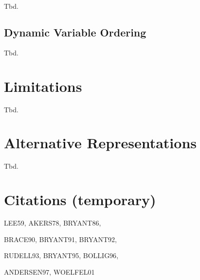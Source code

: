 \documentclass{vldb}
\begin{document}
Tbd.

\subsection{Dynamic Variable Ordering}
\label{subsec:dynamic-variable-ordering}

Tbd.

\section{Limitations}
\label{sec:limitations}

Tbd.

\section{Alternative Representations}
\label{sec:alternative-representations}

Tbd.

\section{Citations (temporary)}

\noindent
\par
LEE59\cite{LEE59}, AKERS78\cite{AKERS78}, BRYANT86\cite{BRYANT86},
\par
BRACE90\cite{BRACE90}, BRYANT91\cite{BRYANT91}, BRYANT92\cite{BRYANT92},
\par
RUDELL93\cite{RUDELL93}, BRYANT95\cite{BRYANT95}, BOLLIG96\cite{BOLLIG96},
\par
ANDERSEN97\cite{ANDERSEN97}, WOELFEL01\cite{WOELFEL01}


\balance



\end{document}
